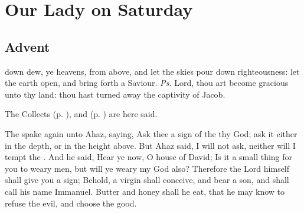 \section{Our Lady on Saturday}\label{MarySaturday}
\fancyhead[RE,LO]{}
\subsection{Advent}
\introit
{} down dew, ye heavens, from above, and let the skies pour down righteousness: let the earth open, and bring forth a Saviour. \textit{Ps.} Lord, thou art become gracious unto thy land: thou hast turned away the captivity of Jacob.
\begin{rubric}
    The Collects  (p. \pageref{SPMaryInAdvent}),  and  (p. \pageref{SPHolyGhost}) are here said.
\end{rubric}
 The  spake again unto Ahaz, saying, Ask thee a sign of the  thy God; ask it either in the depth, or in the height above. But Ahaz said, I will not ask, neither will I tempt the . And he said, Hear ye now, O house of David; Is it a small thing for you to weary men, but will ye weary my God also? Therefore the Lord himself shall give you a sign; Behold, a virgin shall conceive, and bear a son, and shall call his name Immanuel. Butter and honey shall he eat, that he may know to refuse the evil, and choose the good.
